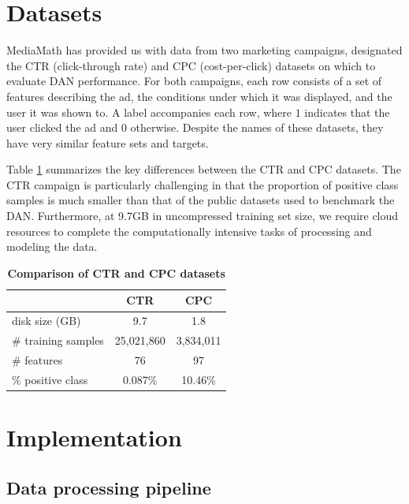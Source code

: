 \documentclass{proc}
\begin{document}
\section{Datasets}

MediaMath has provided us with data from two marketing campaigns, designated the CTR (click-through rate) and CPC (cost-per-click) datasets on which to evaluate DAN performance. For both campaigns, each row consists of a set of features describing the ad, the conditions under which it was displayed, and the user it was shown to. A label accompanies each row, where $1$ indicates that the user clicked the ad and $0$ otherwise. Despite the names of these datasets, they have very similar feature sets and targets.

Table \ref{table:dataset-comparison} summarizes the key differences between the CTR and CPC datasets. The CTR campaign is particularly challenging in that the proportion of positive class samples is much smaller than that of the public datasets used to benchmark the DAN. Furthermore, at 9.7GB in uncompressed training set size, we require cloud resources to complete the computationally intensive tasks of processing and modeling the data.

\begin{table}[]
\begin{center}
	\begin{tabular}{|l|c|c|}
		\hline
 		&  \textbf{CTR} & \textbf{CPC}\\ \hline
 		disk size (GB) & 9.7 & 1.8 \\ \hline
 		\# training samples & 25,021,860 & 3,834,011 \\ \hline
 		\# features & 76 & 97 \\ \hline
 		\% positive class & 0.087\% &  10.46\% \\ \hline
	\end{tabular}
	\caption{\textbf{Comparison of CTR and CPC datasets}}
	\label{table:dataset-comparison}
\end{center}
\end{table}

\section{Implementation}

\subsection{Data processing pipeline}
\end{document}
